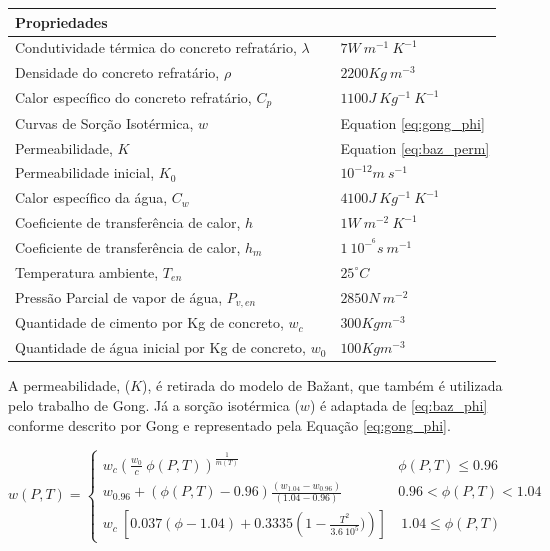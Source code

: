 \begin{table}[]
\begin{tabular}{|ll|}
\multicolumn{2}{|l|}{Propriedades}                                                          \\ \hline
Condutividade térmica do concreto refratário, $\lambda$      & $7 W \ m^{-1} \ K^{-1}$      \\
Densidade do concreto refratário, $\rho$                     & $2200 Kg \ m^{-3}$           \\
Calor específico do concreto refratário, $C_p$               & $1100 J \ Kg^{-1} \ K^{-1}$  \\
Curvas de Sorção Isotérmica, $w$                             & Equation \ref{eq:gong_phi}           \\
Permeabilidade, $K$                                          & Equation \ref{eq:baz_perm}           \\
Permeabilidade inicial, $K_0$                                & $ 10^{-12} m \ s^{-1}$       \\
Calor específico da água, $C_w$                              & $ 4100 J \ Kg^{-1} \ K^{-1}$ \\
Coeficiente de transferência de calor, $h$                   & $ 1 W \ m^{-2} \ K^{-1}$     \\
Coeficiente de transferência de calor, $h_m$                 & $ 1 \ 10^{-^6} s \ m^{-1}$   \\
Temperatura ambiente, $T_{en}$                               & $ 25 ^{\circ}C$              \\
Pressão Parcial de vapor de água, $P_{v, en}$                & $ 2850 N \ m^{-2} $          \\
Quantidade de cimento por Kg de concreto, $w_c$              & $ 300 Kg m^{-3} $            \\
Quantidade de água inicial por Kg de concreto, $w_0$         & $ 100 Kg m^{-3} $            \\ \hline
\end{tabular}
\end{table}

    A permeabilidade, ($K$), é retirada do modelo de Bažant, que também é utilizada pelo
    trabalho de Gong. Já a sorção isotérmica ($w$) é adaptada de \ref{eq:baz_phi}
    conforme descrito por Gong e representado pela Equação \ref{eq:gong_phi}.

\begin{equation}
  \label{eq:gong_phi}
      w(P, T) =
      \begin{cases} 
      w_c \left( \frac{w_0}{c} \ \phi(P,T) \right)^{\frac{1}{m(T)}} & \phi(P, T)\leq 0.96 \\
      w_{0.96} + (\phi(P, T) - 0.96) \frac{(w_{1.04} - w_{0.96})}{(1.04-0.96)} & 0.96 < \phi(P, T) < 1.04 \\
 w_c \ \left[0.037 (\phi-1.04) + 0.3335 \left(1 - \frac{T^2}{3.6 \ 10^5}) \right) \right] & \ 1.04 \leq \phi(P, T)
      \end{cases}
\end{equation}

